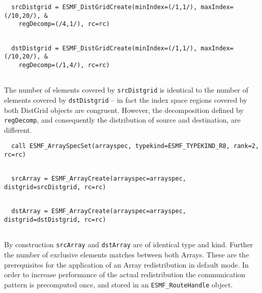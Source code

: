  \begin{verbatim}
  srcDistgrid = ESMF_DistGridCreate(minIndex=(/1,1/), maxIndex=(/10,20/), &
    regDecomp=(/4,1/), rc=rc)
 
\end{verbatim}
 

 \begin{verbatim}
  dstDistgrid = ESMF_DistGridCreate(minIndex=(/1,1/), maxIndex=(/10,20/), &
    regDecomp=(/1,4/), rc=rc)
 
\end{verbatim}
 

   The number of elements covered by {\tt srcDistgrid} is identical to the number
   of elements covered by {\tt dstDistgrid} -- in fact the index space regions
   covered by both DistGrid objects are congruent. However, the decomposition
   defined by {\tt regDecomp}, and consequently the distribution of source and
   destination, are different. 

 \begin{verbatim}
  call ESMF_ArraySpecSet(arrayspec, typekind=ESMF_TYPEKIND_R8, rank=2, rc=rc)
 
\end{verbatim}
 

 \begin{verbatim}
  srcArray = ESMF_ArrayCreate(arrayspec=arrayspec, distgrid=srcDistgrid, rc=rc)
 
\end{verbatim}
 

 \begin{verbatim}
  dstArray = ESMF_ArrayCreate(arrayspec=arrayspec, distgrid=dstDistgrid, rc=rc)
 
\end{verbatim}
 

   By construction {\tt srcArray} and {\tt dstArray} are of identical type and
   kind. Further the number of exclusive elements matches between both Arrays.
   These are the prerequisites for the application of an Array redistribution
   in default mode. In order to increase performance of the actual 
   redistribution the communication pattern is precomputed once, and stored in
   an {\tt ESMF\_RouteHandle} object. 


